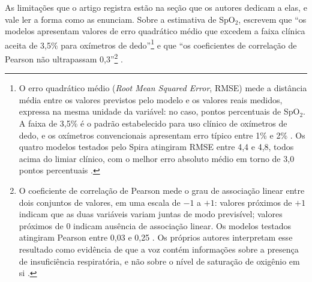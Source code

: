 As limitações que o artigo registra estão na seção que os autores dedicam a elas, e vale ler a forma como as enunciam. Sobre a estimativa de SpO$_2$, escrevem que \enquote{os modelos apresentam valores de erro quadrático médio que excedem a faixa clínica aceita de 3,5\% para oxímetros de dedo}\footnote{O erro quadrático médio (\textit{Root Mean Squared Error}, RMSE) mede a distância média entre os valores previstos pelo modelo e os valores reais medidos, expressa na mesma unidade da variável: no caso, pontos percentuais de SpO$_2$. A faixa de 3,5\% é o padrão estabelecido para uso clínico de oxímetros de dedo, e os oxímetros convencionais apresentam erro típico entre 1\% e 2\% \parencite{Gauy2025Contrasting}. Os quatro modelos testados pelo Spira atingiram RMSE entre 4,4 e 4,8, todos acima do limiar clínico, com o melhor erro absoluto médio em torno de 3,0 pontos percentuais \parencite{Gauy2025Contrasting}.} e que \enquote{os coeficientes de correlação de Pearson não ultrapassam 0,3}\footnote{O coeficiente de correlação de Pearson mede o grau de associação linear entre dois conjuntos de valores, em uma escala de $-1$ a $+1$: valores próximos de $+1$ indicam que as duas variáveis variam juntas de modo previsível; valores próximos de 0 indicam ausência de associação linear. Os modelos testados atingiram Pearson entre 0,03 e 0,25 \parencite{Gauy2025Contrasting}. Os próprios autores interpretam esse resultado como evidência de que a voz contém informações sobre a presença de insuficiência respiratória, e não sobre o nível de saturação de oxigênio em si \parencite{Gauy2025Contrasting}.} \parencite{Gauy2024Discriminant}.

